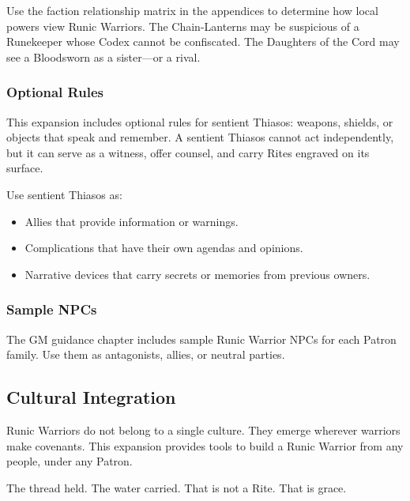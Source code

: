 Use the faction relationship matrix in the appendices to determine how local powers view Runic Warriors. The Chain-Lanterns may be suspicious of a Runekeeper whose Codex cannot be confiscated. The Daughters of the Cord may see a Bloodsworn as a sister—or a rival.

\subsubsection{Optional Rules}

This expansion includes optional rules for sentient Thiasos: weapons, shields, or objects that speak and remember. A sentient Thiasos cannot act independently, but it can serve as a witness, offer counsel, and carry Rites engraved on its surface.

Use sentient Thiasos as:
\begin{itemize}
\item Allies that provide information or warnings.
\item Complications that have their own agendas and opinions.
\item Narrative devices that carry secrets or memories from previous owners.
\end{itemize}

\subsubsection{Sample NPCs}

The GM guidance chapter includes sample Runic Warrior NPCs for each Patron family. Use them as antagonists, allies, or neutral parties.

\subsection{Cultural Integration}

Runic Warriors do not belong to a single culture. They emerge wherever warriors make covenants. This expansion provides tools to build a Runic Warrior from any people, under any Patron.

The thread held. The water carried. That is not a Rite. That is grace.
